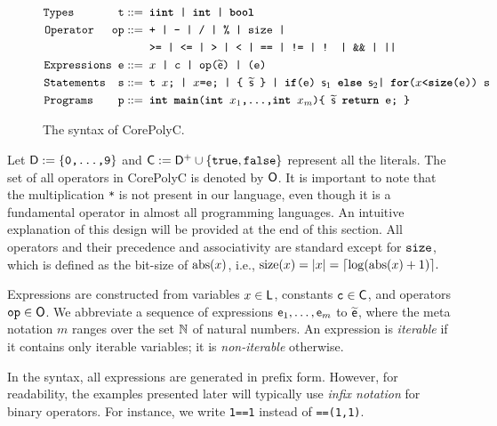 \documentclass[runningheads]{llncs}
\begin{document}
\begin{figure}[t]
\centering
\begin{align*}
\texttt{Types\qquad\quad\;\;t}::=&\texttt{ \textbf{iint} | \textbf{int} | \textbf{bool}}\\
\texttt{Operator\quad\,\;op}::=&\texttt{ + | - | / | \% | size |  }\\
&\texttt{ >= | <= | > | < | == | != | ! | \&\& | || }\\
\texttt{Expressions e}::=&\texttt{ $x$ | c | op($\widetilde{\mathsf{e}}$) | (e) }\\
\texttt{Statements\quad s}::=&\texttt{ t $x$; | $x$=e; | \{ $\widetilde{\mathsf{s}}$ \} | \textbf{if}(e) $\mathsf{s}_1$ \textbf{else} $\mathsf{s}_2$} \texttt{| \textbf{for}($x$<\textbf{size}(e)) s}\\
\texttt{Programs\qquad p}::=&\texttt{ \textbf{int} \textbf{main}(\textbf{int} $x_1$,\dots,\textbf{int} $x_m$)\{ $\widetilde{\mathsf{s}}$ \textbf{return} e; \}}
\end{align*}
\caption{The syntax of CorePolyC. }
\label{fig:vocalbulary}
\end{figure}

Let $\mathsf{D}:=\{\texttt{0,\ldots,9}\}$ and $\mathsf{C} :=\mathsf{D}^{+} \cup \{\texttt{true},\texttt{false}\}$ represent all the literals.
The set of all operators in CorePolyC is denoted by $\mathsf{O}$.
It is important to note that the multiplication \texttt{*} is not present in our language, even though it is a fundamental operator in almost all programming languages.
An intuitive explanation of this design will be provided at the end of this section.
All operators and their precedence and associativity are standard except for $\mathtt{size}$, which is defined as
the bit-size of $\mathrm{abs}(x)$, i.e.,
$
    \mathrm{size}(x)=\vert x\vert=\lceil \log (\mathrm{abs}(x)+1) \rceil.
$

Expressions are constructed from variables $x\in \mathsf{L}$, constants $\mathtt{c}\in \mathsf{C}$, and operators $\mathtt{op}\in\mathsf{O}$.
We abbreviate a sequence of expressions $\mathsf{e}_1, \ldots, \mathsf{e}_m$ to $\widetilde{\mathsf{e}}$,
where the meta notation $m$ ranges over the set $\mathbb{N}$ of natural numbers.
An expression is \textit{iterable} if it contains only iterable variables;
it is \textit{non-iterable} otherwise.

\begin{remark}
    In the syntax, all expressions are generated in prefix form. 
    However, for readability, the examples presented later will typically use \emph{infix notation} for binary operators. 
    For instance, we write \texttt{1==1} instead of \texttt{==(1,1)}.
\end{remark}
\end{document}
